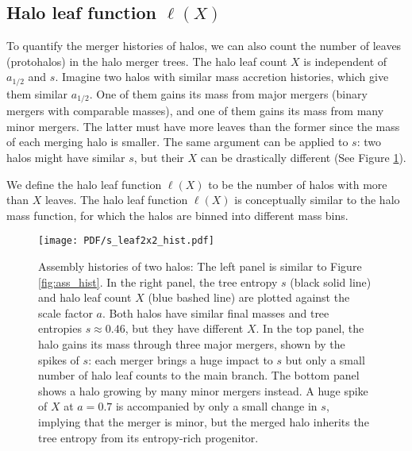 \subsection{Halo leaf function $\ell(X)$}
To quantify the merger histories of halos, we can also count the number of leaves (protohalos) in the halo merger trees. 
The halo leaf count $X$ is independent of $a_{1/2}$ and $s$. 
Imagine two halos with similar mass accretion histories, which give them similar $a_{1/2}$. 
One of them gains its mass from major mergers (binary mergers with comparable masses), and one of them gains its mass from many minor mergers. 
The latter must have more leaves than the former since the mass of each merging halo is smaller. 
The same argument can be applied to $s$: two halos might have similar $s$, but their $X$ can be drastically different (See Figure \ref{fig:leaf_hist}).

We define the halo leaf function $\ell(X)$ to be the number of halos with more than $X$ leaves.
The halo leaf function $\ell(X)$ is conceptually similar to the halo mass function, for which the halos are binned into different mass bins. 

\begin{figure}[htp]
	\begin{center}%
	\texttt{[image: PDF/s\_leaf2x2\_hist.pdf]}
	\caption{\label{fig:leaf_hist}Assembly histories of two halos: 
    The left panel is similar to Figure \ref{fig:ass_hist}.
	In the right panel,
	the tree entropy $s$ (black solid line) and halo leaf count $X$ (blue bashed line) are plotted against the scale factor $a$. 	
	Both halos have similar final masses and tree entropies $s\approx0.46$, but they have different $X$. 
	In the top panel, the halo gains its mass through three major mergers, shown by the spikes of $s$: each merger brings a huge impact to $s$ but only a small number of halo leaf counts to the main branch.
	The bottom panel shows a halo growing by many minor mergers instead. A huge spike of $X$ at $a=0.7$ is accompanied by only a small change in $s$, implying that the merger is minor, but the merged halo inherits the tree entropy from its entropy-rich progenitor.}

	\end{center}

\end{figure}
